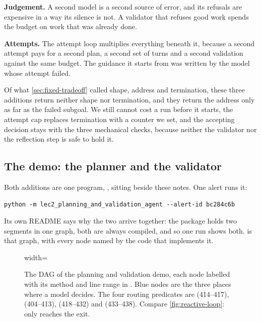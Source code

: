 \item \textbf{Judgement.} A second model is a second source of error, and its refusals are
expensive in a way its silence is not. A validator that refuses good work spends the budget on work
that was already done.

\item \textbf{Attempts.} The attempt loop multiplies everything beneath it, because a second attempt
pays for a second plan, a second set of turns and a second validation against the same budget. The
guidance it starts from was written by the model whose attempt failed.

\ei

Of what \cref{sec:fixed-tradeoff} called shape, address and termination, these three additions
return neither shape nor termination, and they return the address only as far as the failed
subgoal. We still cannot cost a run before it starts, the attempt cap replaces termination with a
counter we set, and the accepting decision stays with the three mechanical checks, because neither
the validator nor the reflection step is safe to hold it.

\subsection{The demo: the planner and the validator}
\label{sec:planning-demo}
\label{sec:validation-demo}

Both additions are one program, , sitting
beside these notes. One alert runs it:

\begin{lstlisting}[basicstyle=\ttfamily\scriptsize, frame=none]
python -m lec2_planning_and_validation_agent --alert-id bc284c6b
\end{lstlisting}

\noindent Its own README says why the two arrive together: the package holds two segments in one
graph, both are always compiled, and so one run shows both.  is that
graph, with every node named by the code that implements it.

\begin{figure}[htbp]
  \centering
  \begin{adjustbox}{width=\linewidth}\end{adjustbox}
  \caption{The DAG of the planning and validation demo, each node labelled with its method and line
  range in . Blue nodes are the three places where a model decides. The four
  routing predicates are  (414--417),  (404--413),
   (418--432) and  (433--438). Compare
  \cref{fig:reactive-loop}: only  reaches the exit.}
  \label{fig:graph-plan-validate}
\end{figure}

